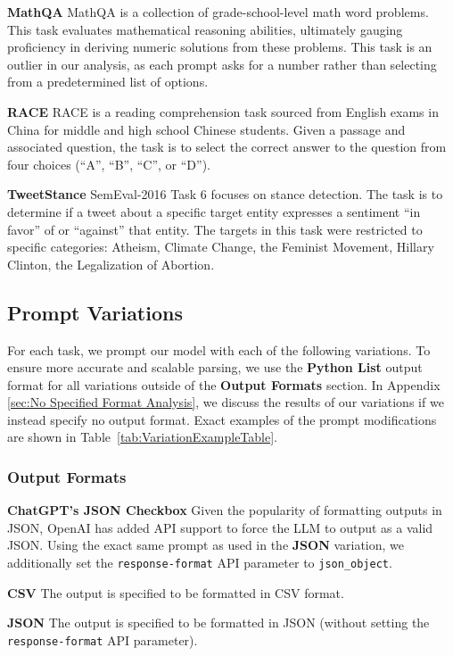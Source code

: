 \documentclass[11pt, dvipsnames]{article}
\begin{document}
\textbf{MathQA}
MathQA \citep{amini2019mathqa} is a collection of grade-school-level math word problems. This task evaluates mathematical reasoning abilities, ultimately gauging proficiency in deriving numeric solutions from these problems. This task is an outlier in our analysis, as each prompt asks for a number rather than selecting from a predetermined list of options.

\textbf{RACE}
RACE \citep{lai2017race} is a reading comprehension task sourced from English exams in China for middle and high school Chinese students. Given a passage and associated question, the task is to select the correct answer to the question from four choices (``A'', ``B'', ``C'', or ``D'').

\textbf{TweetStance}
SemEval-2016 Task 6 \citep{mohammad-etal-2016-semeval} focuses on stance detection. The task is to determine if a tweet about a specific target entity expresses a sentiment ``in favor'' of or ``against'' that entity. The targets in this task were restricted to specific categories: Atheism, Climate Change, the Feminist Movement, Hillary Clinton, the Legalization of Abortion.

\subsection{Prompt Variations}
For each task, we prompt our model with each of the following variations. To ensure more accurate and scalable parsing, we use the \textbf{Python List} output format for all variations outside of the \textbf{Output Formats} section. In Appendix \ref{sec:No Specified Format Analysis}, we discuss the results of our variations if we instead specify no output format. Exact examples of the prompt modifications are shown in Table~\ref{tab:VariationExampleTable}.

\subsubsection{Output Formats}
\label{sec:outputformatlist}
\textbf{ChatGPT's JSON Checkbox}
Given the popularity of formatting outputs in JSON, OpenAI has added API support to force the LLM to output as a valid JSON. Using the exact same prompt as used in the \textbf{JSON} variation, we additionally set the \texttt{response-format} API parameter to \texttt{json\_object}.

\textbf{CSV}
The output is specified to be formatted in CSV format.

\textbf{JSON}
The output is specified to be formatted in JSON (without setting the \texttt{response-format} API parameter).%
\end{document}
